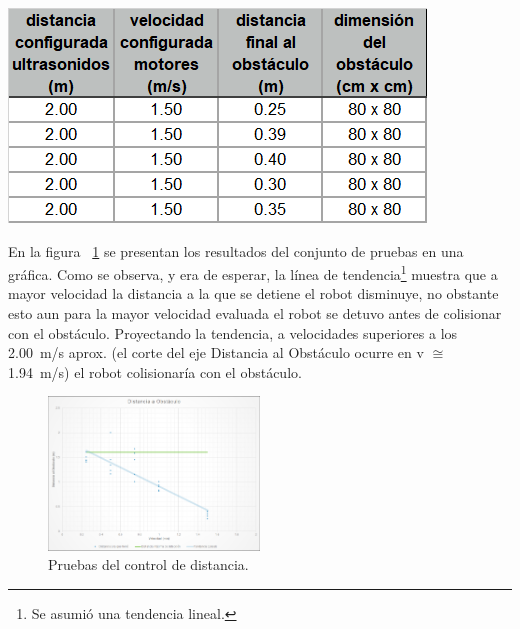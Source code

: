 \documentclass[withindex,glossary]{cam-thesis}
\begin{document}
\begin{table}[H]
  \begin{minipage}[b]{0.4\textwidth}
  	\caption[Test Distancia Ultrasonidos - Velocidad = \SI{1.50}{\metre/\second}]{Resultados de testeo de mecanismo de control de distancia con sensor de ultrasonidos, velocidad \SI{1.50}{\metre/\second}.}  
  	\includegraphics[width=\textwidth]{images/Test_Ultrasonic150}  	
  	\label{table:ultrasonic150}
  \end{minipage}
\end{table}

En la figura ~\ref{fig:plotUltrasonic} se presentan los resultados del conjunto de pruebas en una gráfica. Como se observa, y era de esperar, la línea de tendencia\footnote{Se asumió una tendencia lineal.} muestra que a mayor velocidad la distancia a la que se detiene el robot disminuye, no obstante esto aun para la mayor velocidad evaluada el robot se detuvo antes de colisionar con el obstáculo. Proyectando la tendencia, a velocidades superiores a los \SI{2.00}{\metre/\second} aprox. (el corte del eje Distancia al Obstáculo ocurre en v $\cong$ \SI{1.94}{\metre/\second}) el robot colisionaría con el obstáculo.

\begin{figure}[H]
  \centering
  \includegraphics[width=0.5\textwidth]{images/Plot_UltrasonicBrake}
  \caption[Pruebas del control de distancia]{Pruebas del control de distancia.}
  \label{fig:plotUltrasonic}
\end{figure}
\end{document}

